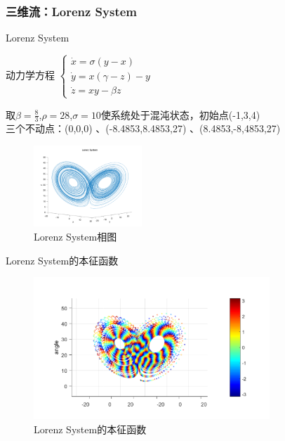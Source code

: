 \documentclass{beamer}
\begin{document}
		\subsubsection{三维流：Lorenz System}
		\begin{frame}{Lorenz System}
		\begin{block}{动力学方程}
			\centering
			\begin{math}
			\begin{cases}
			\dot{x}=\sigma (y-x)\\
			\dot{y}=x(\gamma-z)-y\\
			\dot{z}=xy-\beta z
			\end{cases}\
			\end{math}
		\end{block}
		取$\beta=\frac{8}{3}$,$\rho=28$,$\sigma=10$使系统处于混沌状态，初始点(-1,3,4)\\
		三个不动点：(0,0,0)
、(-8.4853,8.4853,27)
、(8.4853,-8,4853,27)
		\begin{figure}
			\begin{minipage}{0.4\linewidth}
				\centering
				\includegraphics[width=1.6in]{figure/lorenz_phase}
				\caption{Lorenz System相图}
			\end{minipage}
		\end{figure}
		\end{frame}

\begin{frame}{Lorenz System的本征函数}
	\begin{figure}
		\centering
		\includegraphics[width=3.5in]{figure/lorenz_eigen}
		\caption{Lorenz System的本征函数}
	\end{figure}
\end{frame}
\end{document}
